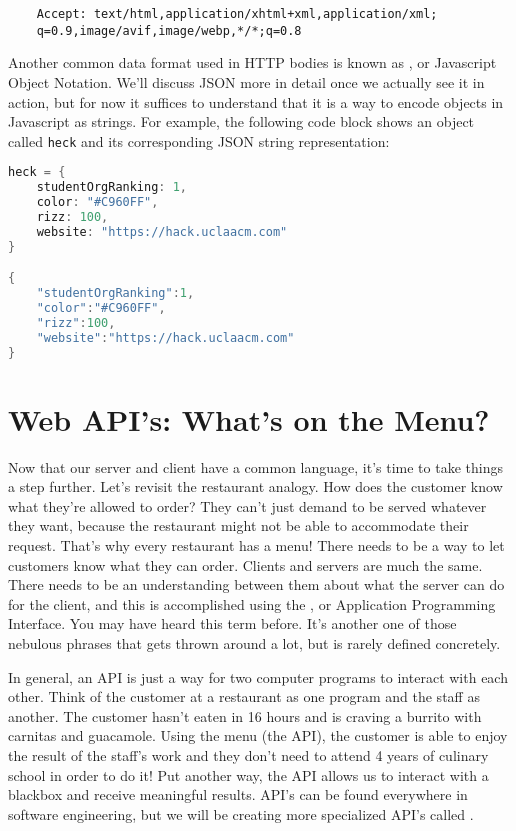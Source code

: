 \begin{verbatim}
    Accept: text/html,application/xhtml+xml,application/xml;
    q=0.9,image/avif,image/webp,*/*;q=0.8
\end{verbatim}

Another common data format used in HTTP bodies is known as , or Javascript Object Notation. We'll discuss JSON more in detail once we actually see it in action, but for now it suffices to understand that it is a way to encode objects in Javascript as strings. For example, the following code block shows an object called \texttt{heck} and its corresponding JSON string representation:

\vspace{.5cm}

\begin{lstlisting}[language=Java]
heck = {
    studentOrgRanking: 1,
    color: "#C960FF",
    rizz: 100,
    website: "https://hack.uclaacm.com"
}

{
    "studentOrgRanking":1,
    "color":"#C960FF",
    "rizz":100,
    "website":"https://hack.uclaacm.com"
}
\end{lstlisting}

\section{Web API's: What's on the Menu?}

Now that our server and client have a common language, it's time to take things a step further. Let's revisit the restaurant analogy. How does the customer know what they're allowed to order? They can't just demand to be served whatever they want, because the restaurant might not be able to accommodate their request. That's why every restaurant has a menu! There needs to be a way to let customers know what they can order. Clients and servers are much the same. There needs to be an understanding between them about what the server can do for the client, and this is accomplished using the , or Application Programming Interface. You may have heard this term before. It's another one of those nebulous phrases that gets thrown around a lot, but is rarely defined concretely.

In general, an API is just a way for two computer programs to interact with each other. Think of the customer at a restaurant as one program and the staff as another. The customer hasn't eaten in 16 hours and is craving a burrito with carnitas and guacamole. Using the menu (the API), the customer is able to enjoy the result of the staff's work and they don't need to attend 4 years of culinary school in order to do it! Put another way, the API allows us to interact with a blackbox and receive meaningful results. API's can be found everywhere in software engineering, but we will be creating more specialized API's called .

